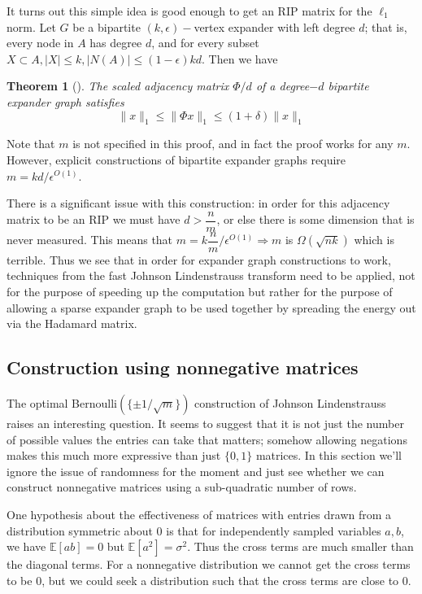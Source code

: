 \documentclass[english]{article}
\theoremstyle{plain}
\newtheorem{theorem}{Theorem}
\begin{document}
It turns out this simple idea is good enough to get an RIP matrix for the $\ell_1$ norm. Let $G$ be a bipartite $(k,\epsilon)-$vertex expander with left degree $d$; that is, every node in $A$ has degree $d$, and for every subset $X \subset A, |X| \le k, |N(A)| \le (1-\epsilon)kd$. Then we have

\begin{theorem}[\cite{Berinde08}]\label{thm:berinde}
	The scaled adjacency matrix $\Phi / d$ of a degree$-d$ bipartite expander graph satisfies
	\[\|x\|_1 \le \|\Phi x\|_1 \le (1+\delta)\|x\|_1\]
\end{theorem}

Note that $m$ is not specified in this proof, and in fact the proof works for any $m$. However, explicit constructions of bipartite expander graphs require $m = kd/\epsilon^{O(1)}$. 

There is a significant issue with this construction: in order for this adjacency matrix to be an RIP we must have $d > \dfrac{n}{m}$, or else there is some dimension that is never measured. This means that $m = k\dfrac{n}{m}/\epsilon^{O(1)} \Longrightarrow m$ is $\Omega(\sqrt{nk})$ which is terrible. Thus we see that in order for expander graph constructions to work, techniques from the fast Johnson Lindenstrauss transform need to be applied, not for the purpose of speeding up the computation but rather for the purpose of allowing a sparse expander graph to be used together by spreading the energy out via the Hadamard matrix. 
%
\subsection{Construction using nonnegative matrices}

The optimal Bernoulli$(\{\pm 1/\sqrt{m}\})$ construction of Johnson Lindenstrauss raises an interesting question. It seems to suggest that it is not just the number of possible values the entries can take that matters; somehow allowing negations makes this much more expressive than just $\{0,1\}$ matrices. In this section we'll ignore the issue of randomness for the moment and just see whether we can construct nonnegative matrices using a sub-quadratic number of rows. 

One hypothesis about the effectiveness of matrices with entries drawn from a distribution symmetric about $0$ is that for independently sampled variables $a,b$, we have $\mathbb{E}[ab] = 0$ but $\mathbb{E}[a^2] = \sigma^2$. Thus the cross terms are much smaller than the diagonal terms. For a nonnegative distribution we cannot get the cross terms to be $0$, but we could seek a distribution such that the cross terms are close to $0$. 
\end{document}

